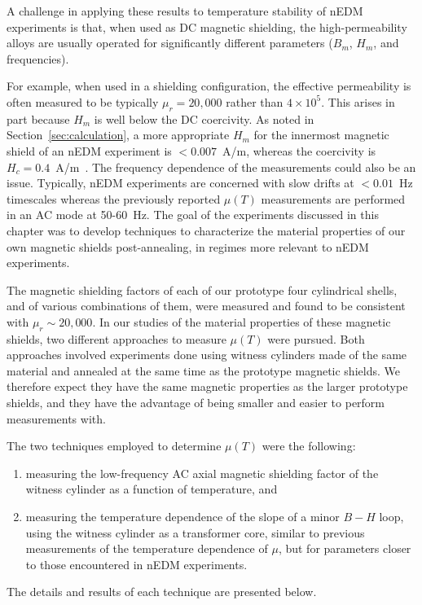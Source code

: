 A challenge in applying these results to temperature stability of nEDM
experiments is that, when used as DC magnetic shielding, the
high-permeability alloys are usually operated for significantly
different parameters ($B_m$, $H_m$, and frequencies).

For example, when used in a shielding configuration, the effective
permeability is often measured to be typically $\mu_r=20,000$ rather
than $4\times 10^5$. This arises in part because $H_m$ is well below
the DC coercivity.  As noted in Section~\ref{sec:calculation}, a more
appropriate $H_m$ for the innermost magnetic shield of an nEDM
experiment is $<0.007$~A/m, whereas the coercivity is
$H_c=0.4$~A/m~\cite{kruppvdm}.  The frequency dependence of the
measurements could also be an issue.  Typically, nEDM experiments are
concerned with slow drifts at $<0.01$~Hz timescales whereas the
previously reported $\mu(T)$ measurements are performed in an AC mode
at 50-60~Hz. The goal of the experiments discussed in this chapter
was to develop techniques to characterize the material properties of
our own magnetic shields post-annealing, in regimes more relevant to
nEDM experiments.




The magnetic shielding factors of each of our prototype four
cylindrical shells, and of various combinations of them, were measured
and found to be consistent with $\mu_r\sim 20,000$.  In our studies of
the material properties of these magnetic shields, two different
approaches to measure $\mu(T)$ were pursued.  Both approaches involved
experiments done using witness cylinders made of the same material and
annealed at the same time as the prototype magnetic shields.  We
therefore expect they have the same magnetic properties as the larger
prototype shields, and they have the advantage of being smaller and
easier to perform measurements with.

The two techniques employed to determine $\mu(T)$ were the following:
\begin{enumerate}
\item measuring the low-frequency AC axial magnetic shielding factor
  of the witness cylinder as a function of temperature, and
\item measuring the temperature dependence of the slope of a minor $B-H$
  loop, using the witness cylinder as a transformer core, similar to
  previous measurements of the temperature dependence of $\mu$, but
  for parameters closer to those encountered in nEDM experiments.
\end{enumerate}
The details and results of each technique are presented below.

